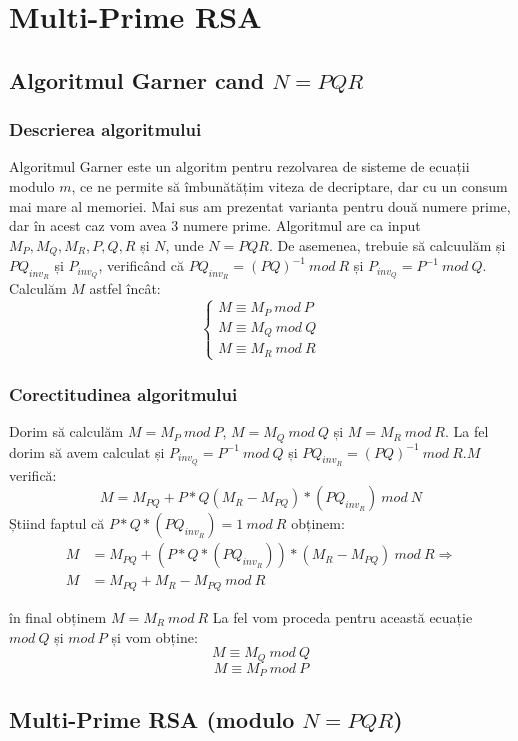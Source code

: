\documentclass[12]{report}
\begin{document}
	    
	    \section{Multi-Prime RSA}
	     \subsection{Algoritmul Garner cand $N=PQR$}
	     \subsubsection{Descrierea algoritmului}
	     Algoritmul Garner este un algoritm pentru rezolvarea de sisteme de ecuații modulo $m$, ce ne permite să îmbunătățim viteza de decriptare, dar cu un consum mai mare al memoriei. Mai sus am prezentat varianta pentru două numere prime, dar în acest caz vom avea $3$ numere prime. Algoritmul are ca input $M_P,M_Q,M_R,P,Q,R$ și $N$, unde $N=PQR$. De asemenea, trebuie să calcuulăm și $PQ_{inv_R}$ și $P_{inv_Q}$, verificând că $PQ_{inv_R}=(PQ)^{-1} \ mod \ R$ și $P_{inv_Q}=P^{-1} \ mod \ Q$. Calculăm $M$ astfel încât: \\
	         \[
\left\{ 
\begin{array}{c}
M \equiv M_P \ mod \ P \\ 
M \equiv M_Q \ mod \ Q \\ 
M \equiv M_R \ mod \ R
\end{array}
\right. 
\]

		\subsubsection{Corectitudinea algoritmului}
		Dorim să calculăm $M=M_P \ mod \ P$, $M=M_Q \ mod \ Q $ și $M=M_R \ mod \ R $. La fel dorim să avem calculat și $P_{inv_Q}=P^{-1} \ mod  \ Q$ și $PQ_{inv_R}=(PQ)^{-1} \ mod \ R$.$ M$ verifică: 
		$$M=M_{PQ} + P*Q(M_R-M_{PQ})*(PQ_{inv_R}) \ mod \ N$$
		Știind faptul că  $P*Q*(PQ_{inv_R})=1 \ mod \ R$ obținem:
		\begin{align*}
	M&=M_{PQ}+(P*Q*(PQ_{inv_R}))*(M_R-M_{PQ}) \ mod \ R \Rightarrow \\
	M&=M_{PQ} + M_R - M_{PQ} \ mod \ R
		\end{align*}

		în final obținem $ M=M_R \ mod \ R $
		La fel vom proceda pentru această ecuație $mod \ Q$ și $mod \ P$ și vom obține:
		$$M \equiv M_Q \ mod \ Q$$
		$$M \equiv M_P \ mod \ P$$
		
		\subsection{Multi-Prime RSA (modulo $N=PQR$)}
\end{document}
